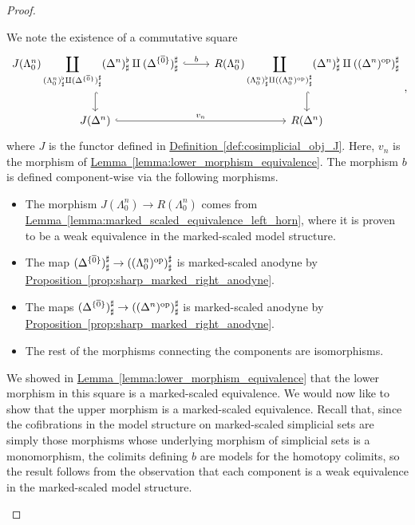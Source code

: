\documentclass[main.tex]{subfiles}
\begin{document}
\begin{proof}
\begin{enumerate}
      We note the existence of a commutative square
      \begin{equation*}
        \begin{tikzcd}
          J(\Lambda^{n}_{0}) \displaystyle\coprod_{(\Lambda^{n}_{0})^{\flat}_{\sharp} \amalg (\Delta^{\{\overline{0}\}})^{\sharp}_{\sharp}}(\Delta^{n})^{\flat}_{\sharp} \amalg (\Delta^{\{\overline{0}\}})^{\sharp}_{\sharp}
          \arrow[r, hook, "b"]
          \arrow[d, hook]
          & R(\Lambda^{n}_{0}) \displaystyle\coprod_{(\Lambda^{n}_{0})^{\flat}_{\sharp} \amalg ((\Lambda^{n}_{0})\op)^{\sharp}_{\sharp}}(\Delta^{n})^{\flat}_{\sharp} \amalg ((\Delta^{n})\op)^{\sharp}_{\sharp}
          \arrow[d, hook]
          \\
          J(\Delta^{n})
          \arrow[r, hook, "v_{n}"]
          & R(\Delta^{n})
        \end{tikzcd},
      \end{equation*}
      where $J$ is the functor defined in \hyperref[def:cosimplicial_obj_J]{Definition~\ref*{def:cosimplicial_obj_J}}. Here, $v_{n}$ is the morphism of \hyperref[lemma:lower_morphism_equivalence]{Lemma~\ref*{lemma:lower_morphism_equivalence}}. The morphism $b$ is defined component-wise via the following morphisms.
      \begin{itemize}
        \item The morphism $J(\Lambda^{n}_{0}) \to R(\Lambda^{n}_{0})$ comes from \hyperref[lemma:marked_scaled_equivalence_left_horn]{Lemma~\ref*{lemma:marked_scaled_equivalence_left_horn}}, where it is proven to be a weak equivalence in the marked-scaled model structure.

        \item The map $(\Delta^{\{\overline{0}\}})^{\sharp}_{\sharp} \to ((\Lambda^{n}_{0})^{\mathrm{op}})^{\sharp}_{\sharp}$ is marked-scaled anodyne by \hyperref[prop:sharp_marked_right_anodyne]{Proposition~\ref*{prop:sharp_marked_right_anodyne}}.

        \item The maps $(\Delta^{\{\overline{0}\}})^{\sharp}_{\sharp} \to ((\Delta^{n})^{\mathrm{op}})^{\sharp}_{\sharp}$ is marked-scaled anodyne by \hyperref[prop:sharp_marked_right_anodyne]{Proposition~\ref*{prop:sharp_marked_right_anodyne}}.

        \item The rest of the morphisms connecting the components are isomorphisms.
      \end{itemize}

      We showed in \hyperref[lemma:lower_morphism_equivalence]{Lemma~\ref*{lemma:lower_morphism_equivalence}} that the lower morphism in this square is a marked-scaled equivalence. We would now like to show that the upper morphism is a marked-scaled equivalence. Recall that, since the cofibrations in the model structure on marked-scaled simplicial sets are simply those morphisms whose underlying morphism of simplicial sets is a monomorphism, the colimits defining $b$ are models for the homotopy colimits, so the result follows from the observation that each component is a weak equivalence in the marked-scaled model structure.


\end{enumerate}
\end{proof}
\end{document}
